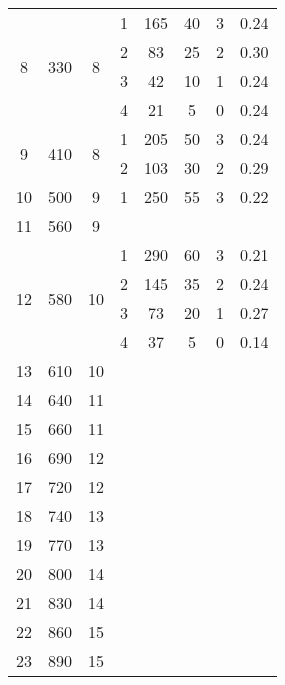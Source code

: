 \begin{longtable}[c]{|c|c|c|c|c|c|c|c|}
    \multirow{4}{*}{8} & \multirow{4}{*}{330} & \multirow{4}{*}{8} & 1 & 165 & 40 & 3 & 0.24 \\\cline{4-8}
    & & & 2 & 83 & 25 & 2 & 0.30 \\\cline{4-8}
    & & & 3 & 42 & 10 & 1 & 0.24 \\\cline{4-8}
    & & & 4 & 21 & 5 & 0 & 0.24 \\\hline
    \multirow{2}{*}{9} & \multirow{2}{*}{410} & \multirow{2}{*}{8} & 1 & 205 & 50 & 3 & 0.24 \\\cline{4-8}
    & & & 2 & 103 & 30 & 2 & 0.29 \\\hline
    \multirow{1}{*}{10} & \multirow{1}{*}{500} & \multirow{1}{*}{9} & 1 & 250 & 55 & 3 & 0.22 \\\hline
    \multirow{1}{*}{11} & \multirow{1}{*}{560} & \multirow{1}{*}{9} & & & & & \\\hline
    \multirow{4}{*}{12} & \multirow{4}{*}{580} & \multirow{4}{*}{10} & 1 & 290 & 60 & 3 & 0.21 \\\cline{4-8}
    & & & 2 & 145 & 35 & 2 & 0.24 \\\cline{4-8}
    & & & 3 & 73 & 20 & 1 & 0.27 \\\cline{4-8}
    & & & 4 & 37 & 5 & 0 & 0.14 \\\hline
    \multirow{1}{*}{13} & \multirow{1}{*}{610} & \multirow{1}{*}{10} & & & & & \\\hline
    \multirow{1}{*}{14} & \multirow{1}{*}{640} & \multirow{1}{*}{11} & & & & & \\\hline
    \multirow{1}{*}{15} & \multirow{1}{*}{660} & \multirow{1}{*}{11} & & & & & \\\hline
    \multirow{1}{*}{16} & \multirow{1}{*}{690} & \multirow{1}{*}{12} & & & & & \\\hline
    \multirow{1}{*}{17} & \multirow{1}{*}{720} & \multirow{1}{*}{12} & & & & & \\\hline
    \multirow{1}{*}{18} & \multirow{1}{*}{740} & \multirow{1}{*}{13} & & & & & \\\hline
    \multirow{1}{*}{19} & \multirow{1}{*}{770} & \multirow{1}{*}{13} & & & & & \\\hline
    \multirow{1}{*}{20} & \multirow{1}{*}{800} & \multirow{1}{*}{14} & & & & & \\\hline
    \multirow{1}{*}{21} & \multirow{1}{*}{830} & \multirow{1}{*}{14} & & & & & \\\hline
    \multirow{1}{*}{22} & \multirow{1}{*}{860} & \multirow{1}{*}{15} & & & & & \\\hline
    \multirow{1}{*}{23} & \multirow{1}{*}{890} & \multirow{1}{*}{15} & & & & & \\\hline

\end{longtable}
